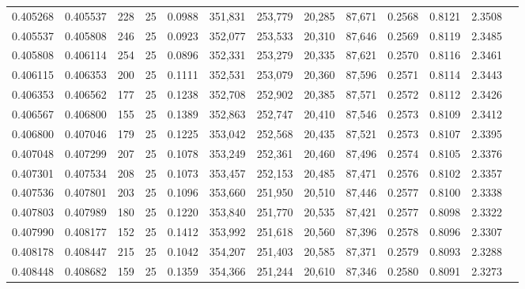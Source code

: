 \begin{tabular}{rrrrrrrrrrrrr}
0.405268 & 0.405537 &   228 &  25 &                                     0.0988 & 351,831 & 253,779 &  20,285 &  87,671 & 0.2568 & 0.8121 & 2.3508 \\
0.405537 & 0.405808 &   246 &  25 &                                     0.0923 & 352,077 & 253,533 &  20,310 &  87,646 & 0.2569 & 0.8119 & 2.3485 \\
0.405808 & 0.406114 &   254 &  25 &                                     0.0896 & 352,331 & 253,279 &  20,335 &  87,621 & 0.2570 & 0.8116 & 2.3461 \\
0.406115 & 0.406353 &   200 &  25 &                                     0.1111 & 352,531 & 253,079 &  20,360 &  87,596 & 0.2571 & 0.8114 & 2.3443 \\
0.406353 & 0.406562 &   177 &  25 &                                     0.1238 & 352,708 & 252,902 &  20,385 &  87,571 & 0.2572 & 0.8112 & 2.3426 \\
0.406567 & 0.406800 &   155 &  25 &                                     0.1389 & 352,863 & 252,747 &  20,410 &  87,546 & 0.2573 & 0.8109 & 2.3412 \\
0.406800 & 0.407046 &   179 &  25 &                                     0.1225 & 353,042 & 252,568 &  20,435 &  87,521 & 0.2573 & 0.8107 & 2.3395 \\
0.407048 & 0.407299 &   207 &  25 &                                     0.1078 & 353,249 & 252,361 &  20,460 &  87,496 & 0.2574 & 0.8105 & 2.3376 \\
0.407301 & 0.407534 &   208 &  25 &                                     0.1073 & 353,457 & 252,153 &  20,485 &  87,471 & 0.2576 & 0.8102 & 2.3357 \\
0.407536 & 0.407801 &   203 &  25 &                                     0.1096 & 353,660 & 251,950 &  20,510 &  87,446 & 0.2577 & 0.8100 & 2.3338 \\
0.407803 & 0.407989 &   180 &  25 &                                     0.1220 & 353,840 & 251,770 &  20,535 &  87,421 & 0.2577 & 0.8098 & 2.3322 \\
0.407990 & 0.408177 &   152 &  25 &                                     0.1412 & 353,992 & 251,618 &  20,560 &  87,396 & 0.2578 & 0.8096 & 2.3307 \\
0.408178 & 0.408447 &   215 &  25 &                                     0.1042 & 354,207 & 251,403 &  20,585 &  87,371 & 0.2579 & 0.8093 & 2.3288 \\
0.408448 & 0.408682 &   159 &  25 &                                     0.1359 & 354,366 & 251,244 &  20,610 &  87,346 & 0.2580 & 0.8091 & 2.3273 \\

\end{tabular}
